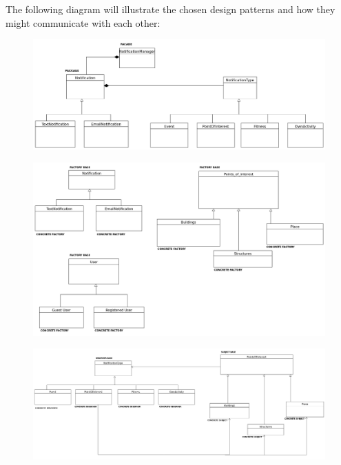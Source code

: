 \documentclass{article}
\begin{document}
The following diagram will illustrate the chosen design patterns and how they might communicate with each other:
	\begin{figure}[h]
  		\includegraphics[width=\textwidth]{Images/Facade.png}
	\end{figure}
	\begin{figure}[h]
  		\includegraphics[width=\textwidth]{Images/Factory.png}
	\end{figure}
	\begin{figure}[h]
  		\includegraphics[width=\textwidth]{Images/Observer.png}
	\end{figure}
\end{document}
